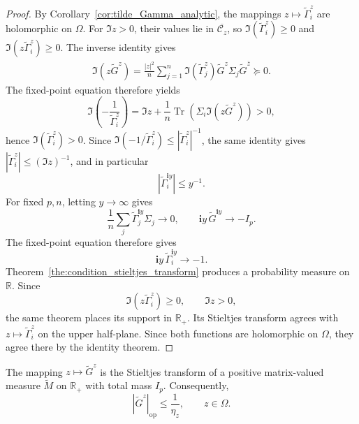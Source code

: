 \documentclass[EJP, preprint, NODS, nobera, nofontexpansion]{ejpecp}
\newcommand{\ii}{\mathbf{i}}
\DeclareMathOperator{\op}{op}
\DeclareMathOperator{\tr}{Tr}
\begin{document}
\begin{proof}
By Corollary~\ref{cor:tilde_Gamma_analytic}, the mappings
\(z\mapsto\tilde\Gamma_i^z\) are holomorphic on \(\Omega\).
For \(\Im z>0\), their values lie in
\(\overline{\mathcal C_z}\), so
\(\Im(\tilde\Gamma_i^z)\geq0\) and
\(\Im(z\tilde\Gamma_i^z)\geq0\). The inverse identity gives
\begin{align}\label{eq:scalar_resolvent_imaginary_part}
    \Im(z\tilde G^z)
    =\frac{|z|^2}{n}\sum_{j=1}^n
      \Im(\tilde\Gamma_j^z)
      \tilde G^z\Sigma_j\tilde G^{\bar z}
    \succeq0.
\end{align}
The fixed-point equation therefore yields
\[
    \Im\!\left(-\frac1{\tilde\Gamma_i^z}\right)
    =\Im z+\frac1n\tr\!\left(\Sigma_i\Im(z\tilde G^z)\right)
    >0,
\]
hence \(\Im(\tilde\Gamma_i^z)>0\). Since
\(\Im(-1/\tilde\Gamma_i^z)\leq|\tilde\Gamma_i^z|^{-1}\), the same
identity gives \(|\tilde\Gamma_i^z|\leq(\Im z)^{-1}\), and in particular
\[
    |\tilde\Gamma_i^{\ii y}|\leq y^{-1}.
\]
For fixed \(p,n\), letting \(y\to\infty\) gives
\[
    \frac1n\sum_j\tilde\Gamma_j^{\ii y}\Sigma_j
    \longrightarrow0,
    \qquad
    \ii y\,\tilde G^{\ii y}\longrightarrow-I_p.
\]
The fixed-point equation therefore gives
\[
    \ii y\,\tilde\Gamma_i^{\ii y}\longrightarrow-1.
\]
Theorem~\ref{the:condition_stieltjes_transform} produces a probability
measure on \(\mathbb R\).  Since
\[
    \Im(z\tilde\Gamma_i^z)\geq0,
    \qquad \Im z>0,
\]
the same theorem places its support in \(\mathbb R_+\).  Its Stieltjes transform agrees with \(z\mapsto\tilde\Gamma_i^z\)
on the upper half-plane. Since both functions are holomorphic on
\(\Omega\), they agree there by the identity theorem.
\end{proof}

\begin{proposition}\label{pro:matrix_stieltjes_representation}
The mapping \(z\mapsto\tilde G^z\) is the Stieltjes transform of a positive
matrix-valued measure \(\tilde M\) on \(\mathbb R_+\) with total mass
\(I_p\).  Consequently,
\[
    |\tilde G^z|_{\op}\leq\frac1{\eta_z},
    \qquad z\in\Omega.
\]
\end{proposition}
\end{document}
